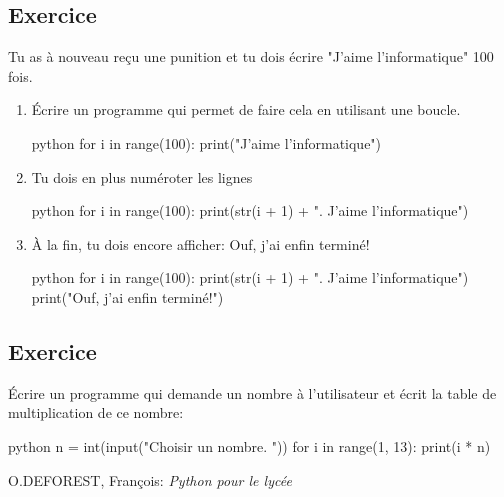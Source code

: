 \documentclass[a4paper,11pt]{article}
\begin{document}
\subsection{Exercice}
Tu as à nouveau reçu une punition et tu dois écrire "J'aime l'informatique" 100 fois.
\begin{enumerate}
\item Écrire un programme qui permet de faire cela en utilisant une boucle.
\begin{solution}
\begin{code}[interactive]{python}
for i in range(100):
    print("J'aime l'informatique")
\end{code}
\end{solution}
\item Tu dois en plus numéroter les lignes
\begin{solution}
\begin{code}[interactive]{python}
for i in range(100):
    print(str(i + 1) + ". J'aime l'informatique")
\end{code}
\end{solution}
\item À la fin, tu dois encore afficher: Ouf, j'ai enfin terminé!
\begin{solution}
\begin{code}[interactive]{python}
for i in range(100):
    print(str(i + 1) + ". J'aime l'informatique")
print("Ouf, j'ai enfin terminé!")
\end{code}
\end{solution}
\end{enumerate}

\subsection{Exercice}
Écrire un programme qui demande un nombre à l'utilisateur et écrit la table de multiplication de ce nombre:\\
\begin{solution}
\begin{code}[interactive]{python}
n = int(input("Choisir un nombre. "))
for i in range(1, 13):
  print(i * n)
\end{code}
\end{solution}

\vfill
\renewcommand{\refname}{Références}
\begin{thebibliography}{9}
 O.DEFOREST, François: \emph{Python pour le lycée}
\end{thebibliography}
\end{document}
